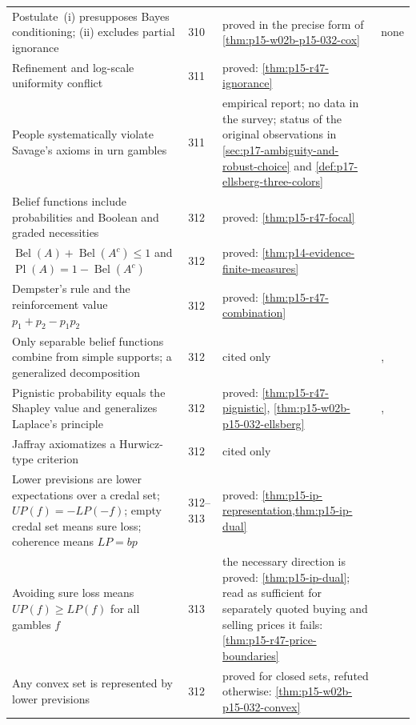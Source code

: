 \begin{longtable}{@{}p{.36\linewidth}p{.07\linewidth}p{.27\linewidth}p{.22\linewidth}@{}}
Postulate~(i) presupposes Bayes conditioning; (ii) excludes partial
ignorance & 310 & proved in the precise form of
\cref{thm:p15-w02b-p15-032-cox} & none \\
Refinement and log-scale uniformity conflict & 311 & proved:
\cref{thm:p15-r47-ignorance} & \cite{R47Shafer1976} \\
People systematically violate Savage's axioms in urn gambles & 311 &
empirical report; no data in the survey; status of the original
observations in \cref{sec:p17-ambiguity-and-robust-choice} and
\cref{def:p17-ellsberg-three-colors} & \cite{Ellsberg1961Ambiguity} \\
Belief functions include probabilities and Boolean and graded necessities &
312 & proved: \cref{thm:p15-r47-focal} & \cite{R47Shafer1976} \\
\(\operatorname{Bel}(A)+\operatorname{Bel}(A^c)\leq1\) and
\(\operatorname{Pl}(A)=1-\operatorname{Bel}(A^c)\) & 312 & proved:
\cref{thm:p14-evidence-finite-measures} & \cite{R47Shafer1976} \\
Dempster's rule and the reinforcement value \(p_1+p_2-p_1p_2\) & 312 &
proved: \cref{thm:p15-r47-combination} & \cite{R47Dempster1967} \\
Only separable belief functions combine from simple supports; a
generalized decomposition & 312 & cited only & \cite{R47Shafer1976},
\cite{R47Smets1995} \\
Pignistic probability equals the Shapley value and generalizes Laplace's
principle & 312 & proved: \cref{thm:p15-r47-pignistic},
\cref{thm:p15-w02b-p15-032-ellsberg} & \cite{R47SmetsKennes1994},
\cite{R47Shapley1953} \\
Jaffray axiomatizes a Hurwicz-type criterion & 312 & cited only &
\cite{R47Jaffray1989} \\
Lower previsions are lower expectations over a credal set; \(UP(f)=-LP(-f)\);
empty credal set means sure loss; coherence means \(LP=bp\) & 312--313 &
proved: \cref{thm:p15-ip-representation,thm:p15-ip-dual} &
\cite{R47Walley1991} \\
Avoiding sure loss means \(UP(f)\geq LP(f)\) for all gambles \(f\) &
313 & the necessary direction is proved: \cref{thm:p15-ip-dual}; read as
sufficient for separately quoted buying and selling prices it fails:
\cref{thm:p15-r47-price-boundaries} & \cite{R47Walley1991} \\
Any convex set is represented by lower previsions & 312 & proved for
closed sets, refuted otherwise: \cref{thm:p15-w02b-p15-032-convex} &
\cite{R47Walley1991} \\

\end{longtable}
